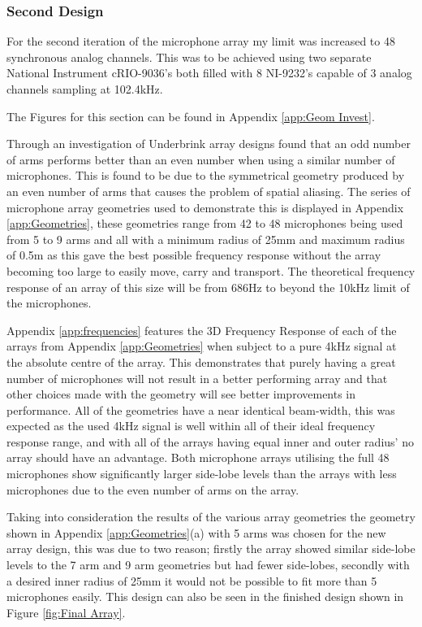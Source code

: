 \documentclass{UoNMCHA}
\numberwithin{equation}{section}
\begin{document}
\subsubsection{Second Design} \label{sec:Second Array Design}
    For the second iteration of the microphone array my limit was increased to 48 synchronous analog channels. This was to be achieved using two separate National Instrument cRIO-9036's both filled with 8 NI-9232's capable of 3 analog channels sampling at 102.4kHz.
    
    The Figures for this section can be found in Appendix \ref{app:Geom Invest}.
    
    Through an investigation of Underbrink array designs found that an odd number of arms performs better than an even number when using a similar number of microphones. This is found to be due to the symmetrical geometry produced by an even number of arms that causes the problem of spatial aliasing. The series of microphone array geometries used to demonstrate this is displayed in Appendix \ref{app:Geometries}, these geometries range from 42 to 48 microphones being used from 5 to 9 arms and all with a minimum radius of 25mm and maximum radius of 0.5m as this gave the best possible frequency response without the array becoming too large to easily move, carry and transport. The theoretical frequency response of an array of this size will be from 686Hz to beyond the 10kHz limit of the microphones.
    
    Appendix \ref{app:frequencies} features the 3D Frequency Response of each of the arrays from Appendix \ref{app:Geometries} when subject to a pure 4kHz signal at the absolute centre of the array. This demonstrates that purely having a great number of microphones will not result in a better performing array and that other choices made with the geometry will see better improvements in performance. All of the geometries have a near identical beam-width, this was expected as the used 4kHz signal is well within all of their ideal frequency response range, and with all of the arrays having equal inner and outer radius' no array should have an advantage. Both microphone arrays utilising the full 48 microphones show significantly larger side-lobe levels than the arrays with less microphones due to the even number of arms on the array.
    
    Taking into consideration the results of the various array geometries the geometry shown in Appendix \ref{app:Geometries}(a) with 5 arms was chosen for the new array design, this was due to two reason; firstly the array showed similar side-lobe levels to the 7 arm and 9 arm geometries but had fewer side-lobes, secondly with a desired inner radius of 25mm it would not be possible to fit more than 5 microphones easily. This design can also be seen in the finished design shown in Figure \ref{fig:Final Array}.
        
\end{document}
